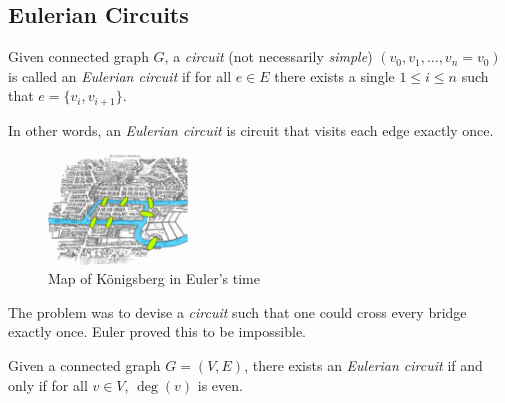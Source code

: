 \documentclass[00_complete]{subfiles}
\begin{document}
\subsection{Eulerian Circuits}
\begin{definition}
   Given connected graph $G$, a \emph{circuit} (not necessarily \emph{simple})
   $(v_0,v_1,\dots,v_n=v_0)$ is called an \emph{Eulerian circuit} if for all $e
   \in E$ there exists a single $1\leq i \leq n$ such that $e=\{v_i,v_{i+1}\}$.

   In other words, an \emph{Eulerian circuit} is circuit that visits each edge
   exactly once.
\end{definition}
\begin{example}
    \begin{figure}[ht]
        \centering
        \includegraphics[width=0.33\textwidth]{w12_konigsberg}
        \caption{Map of K\"onigsberg in Euler's time}
    \end{figure}
    The problem was to devise a \emph{circuit} such that one could cross every
    bridge exactly once. Euler proved this to be impossible.
\end{example}
\begin{theorem}
    Given a connected graph $G=(V,E)$, there exists an \emph{Eulerian circuit}
    if and only if for all $v \in V$, $\deg(v)$ is even.
\end{theorem}
\end{document}
